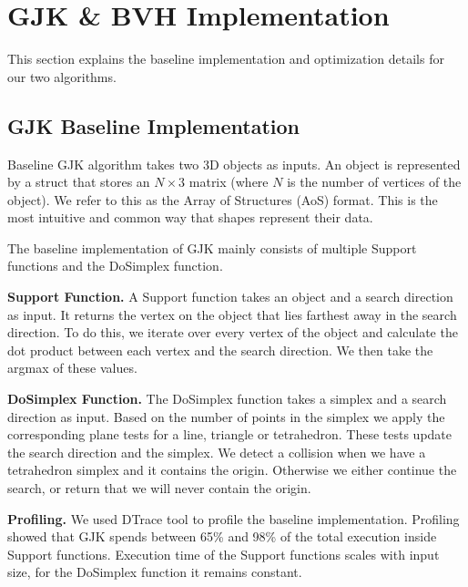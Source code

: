 \documentclass[twocolumn]{article}
\newcommand{\mypar}[1]{{\bf #1.}}
\begin{document}
\section{GJK \& BVH Implementation}\label{sec:yourmethod}
This section explains the baseline implementation and optimization details for our two algorithms. 
\subsection{GJK Baseline Implementation}
\label{subsec:gjkbase}
Baseline GJK algorithm takes two 3D objects as inputs. An object is represented by a struct that stores an $N \times 3$ matrix (where $N$ is the number of vertices of the object). We refer to this as the Array of Structures (AoS) format. This is the most intuitive and common way that shapes represent their data.

The baseline implementation of GJK mainly consists of multiple Support functions and the DoSimplex function.


\mypar{Support Function}
A Support function takes an object and a search direction as input. It returns the vertex on the object that lies farthest away in the search direction. To do this, we iterate over every vertex of the object and calculate the dot product between each vertex and the search direction. We then take the argmax of these values.

\mypar{DoSimplex Function}
The DoSimplex function takes a simplex and a search direction as input. Based on the number of points in the simplex we apply the corresponding plane tests for a line, triangle or tetrahedron. These tests update the search direction and the simplex. We detect a collision when we have a tetrahedron simplex and it contains the origin. Otherwise we either continue the search, or return that we will never contain the origin.

\mypar{Profiling}
We used DTrace tool to profile the baseline implementation. Profiling showed that GJK spends between 65\% and 98\% of the total execution inside Support functions. Execution time of the Support functions scales with input size, for the DoSimplex function it remains constant. 
\end{document}
